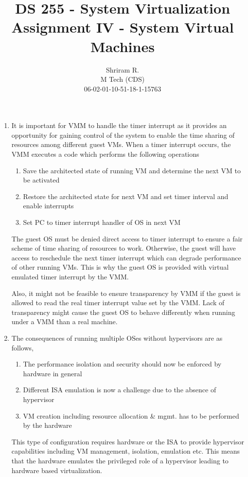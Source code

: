 \documentclass[11pt,a4paper,oneside]{article}
\begin{document}
	\title{DS 255 - System Virtualization \\ Assignment IV - System Virtual Machines}
	\author{Shriram R. \\ M Tech (CDS) \\ 06-02-01-10-51-18-1-15763}
	\maketitle	
	
	\begin{enumerate}
		\item It is important for VMM to handle the timer interrupt as it provides an opportunity for gaining control of the system to enable the time sharing of resources among different guest VMs. When a timer interrupt occurs, the VMM executes a code which performs the following operations
		\begin{enumerate}
			\item Save the architected state of running VM and determine the next VM to be activated
			\item Restore the architected state for next VM and set timer interval and enable interrupts
			\item Set PC to timer interrupt handler of OS in next VM
		\end{enumerate}
	    The guest OS must be denied direct access to timer interrupt to ensure a fair scheme of time sharing of resources to work. Otherwise, the guest will have access to reschedule the next timer interrupt which can degrade performance of other running VMs. This is why the guest OS is provided with virtual emulated timer interrupt by the VMM.
	    
	    Also, it might not be feasible to ensure transparency by VMM if the guest is allowed to read the real timer interrupt value set by the VMM. Lack of transparency might cause the guest OS to behave differently when running under a VMM than a real machine.
		
		\item The consequences of running multiple OSes without hypervisors are as follows,
		\begin{enumerate}
			\item The performance isolation and security should now be enforced by hardware in general
            \item Different ISA emulation is now a challenge due to the absence of hypervisor
            \item VM creation including resource allocation \& mgmt. has to be performed by the hardware
		\end{enumerate}
	    This type of configuration requires hardware or the ISA to provide hypervisor capabilities including VM management, isolation, emulation etc. This means that the hardware emulates the privileged role of a hypervisor leading to hardware based virtualization.
		

\end{enumerate}
\end{document}
